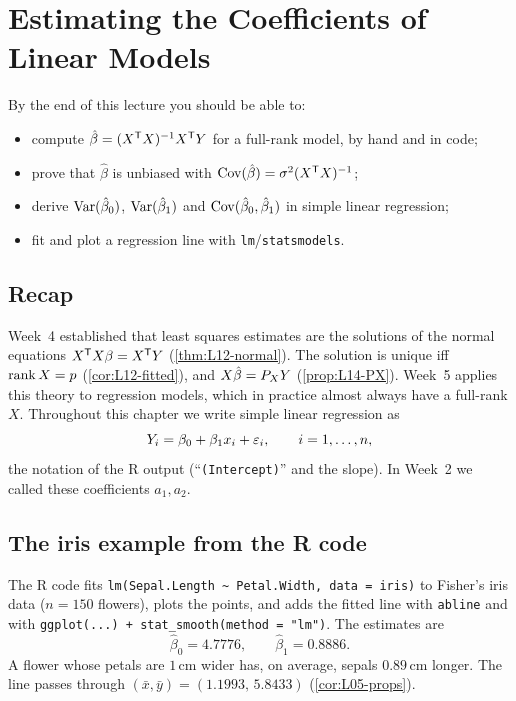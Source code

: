 \section{Estimating the Coefficients of Linear Models}\label{sec:L15}


\begin{guiding*}
By the end of this lecture you should be able to:
\begin{itemize}
  \item compute $\hat\beta=(X^{\mathsf T} X)^{-1}X^{\mathsf T} Y$ for a full-rank model, by hand and in code;
  \item prove that $\hat\beta$ is unbiased with $\operatorname{Cov}(\hat\beta)=\sigma^2(X^{\mathsf T} X)^{-1}$;
  \item derive $\operatorname{Var}(\hat\beta_0)$, $\operatorname{Var}(\hat\beta_1)$ and $\operatorname{Cov}(\hat\beta_0,\hat\beta_1)$ in simple linear regression;
  \item fit and plot a regression line with \texttt{lm}/\texttt{statsmodels}.
\end{itemize}
\end{guiding*}

\subsection{Recap}
Week~4 established that least squares estimates are the solutions of the normal equations
$X^{\mathsf T} X\beta=X^{\mathsf T} Y$ (\cref{thm:L12-normal}). The solution is unique iff $\operatorname{rank} X=p$
(\cref{cor:L12-fitted}), and $X\hat\beta=P_X Y$ (\cref{prop:L14-PX}). Week~5 applies this theory to
regression models, which in practice almost always have a full-rank $X$. Throughout this chapter we
write simple linear regression as
\[
Y_i=\beta_0+\beta_1x_i+\varepsilon_i,\qquad i=1,\dots,n,
\]
the notation of the R output (``\texttt{(Intercept)}'' and the slope). In Week~2 we called these
coefficients $a_1,a_2$.

\subsection{The iris example from the R code}
\begin{example}\label{ex:L15-iris}
The R code fits \texttt{lm(Sepal.Length \textasciitilde\ Petal.Width, data = iris)} to Fisher's iris data
($n=150$ flowers), plots the points, and adds the fitted line with \texttt{abline} and with
\texttt{ggplot(...) + stat\_smooth(method = "lm")}. The estimates are
\[
\hat\beta_0=4.7776,\qquad \hat\beta_1=0.8886 .
\]
A flower whose petals are $1$\,cm wider has, on average, sepals $0.89$\,cm longer. The line
passes through $(\bar x,\bar y)=(1.1993,\,5.8433)$ (\cref{cor:L05-props}).
\end{example}

